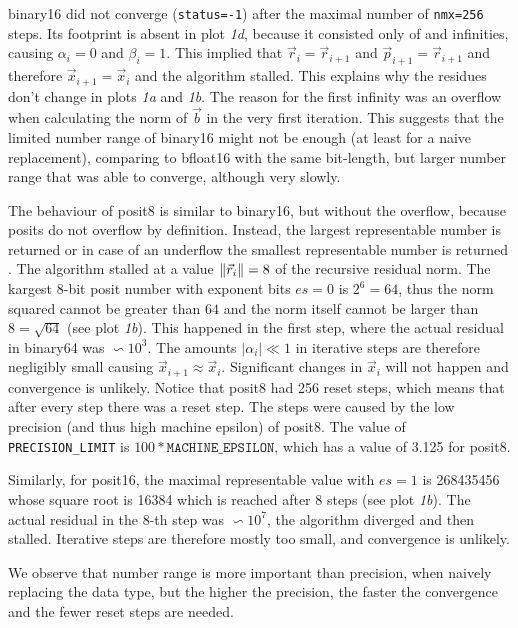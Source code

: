 \documentclass{article}
\theoremstyle{plain} %
\theoremstyle{convention} %
\theoremstyle{remark} %
\def\code#1{\texttt{#1}}
\numberwithin{equation}{section}
\begin{document}
\gls{binary16} did not converge (\code{status=-1}) after the maximal number of \code{nmx=256} steps. Its footprint is absent in plot \textit{1d}, because it consisted only of  and infinities, causing $\alpha_i = 0$ and $\beta_i = 1$. This implied that $\vec{r}_i = \vec{r}_{i+1}$ and $\vec{p}_{i+1} = \vec{r}_{i+1}$ and therefore $\vec{x}_{i+1} = \vec{x}_{i}$ and the algorithm stalled. This explains why the residues don't change in plots \textit{1a} and \textit{1b}. The reason for the first infinity was an overflow when calculating the norm of $\vec{b}$ in the very first iteration. This suggests that the limited number range of \gls{binary16} might not be enough (at least for a naive replacement), comparing to \gls{bfloat16} with the same bit-length, but larger number range that was able to converge, although very slowly.

The behaviour of \gls{posit8} is similar to \gls{binary16}, but without the overflow, because posits do not overflow by definition. Instead, the largest representable number is returned or in case of an underflow the smallest representable number is returned \cite{posit2018standard}. The algorithm stalled at a value $\norm{\vec{r}_i} = 8$ of the recursive residual norm. The kargest \num{8}-bit posit number with exponent bits $es=0$ is $2^6 = 64$, thus the norm squared cannot be greater than $64$ and the norm itself cannot be larger than $8 = \sqrt{64}$ (see plot \textit{1b}). This happened in the first step, where the actual residual in \gls{binary64} was $\backsim 10^3$. The amounts $|\alpha_i| \ll 1$ in iterative steps are therefore negligibly small causing $\vec{x}_{i+1} \approx \vec{x}_i$. Significant changes in $\vec{x}_i$ will not happen and convergence is unlikely. Notice that \gls{posit8} had \num{256} reset steps, which means that after every step there was a reset step. The steps were caused by the low precision (and thus high machine epsilon) of \gls{posit8}. The value of \code{PRECISION\_LIMIT} is $100*\code{MACHINE\_EPSILON}$, which has a value of \num{3.125} for \gls{posit8}.

Similarly, for \gls{posit16}, the maximal representable value with $es=1$ is \num{268435456} whose square root is \num{16384} which is reached after $8$ steps (see plot \textit{1b}). The actual residual in the $8$-th step was $\backsim 10^7$, the algorithm diverged and then stalled. Iterative steps are therefore mostly too small, and convergence is unlikely.

We observe that number range is more important than precision, when naively replacing the data type, but the higher the precision, the faster the convergence and the fewer reset steps are needed.
\end{document}
